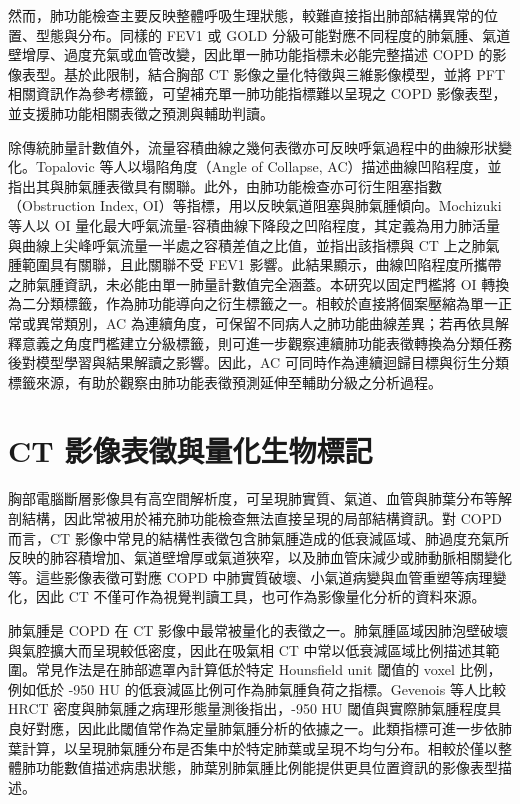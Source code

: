 \begin{ZhChapter}
然而，肺功能檢查主要反映整體呼吸生理狀態，較難直接指出肺部結構異常的位置、型態與分布。同樣的 FEV1 或 GOLD 分級可能對應不同程度的肺氣腫、氣道壁增厚、過度充氣或血管改變，因此單一肺功能指標未必能完整描述 COPD 的影像表型\cite{park2025qctcopd}。基於此限制，結合胸部 CT 影像之量化特徵與三維影像模型，並將 PFT 相關資訊作為參考標籤，可望補充單一肺功能指標難以呈現之 COPD 影像表型，並支援肺功能相關表徵之預測與輔助判讀。

除傳統肺量計數值外，流量容積曲線之幾何表徵亦可反映呼氣過程中的曲線形狀變化。Topalovic 等人以塌陷角度（Angle of Collapse, AC）描述曲線凹陷程度，並指出其與肺氣腫表徵具有關聯\cite{topalovic2013anglecollapse}。此外，由肺功能檢查亦可衍生阻塞指數（Obstruction Index, OI）等指標，用以反映氣道阻塞與肺氣腫傾向。Mochizuki 等人以 OI 量化最大呼氣流量-容積曲線下降段之凹陷程度，其定義為用力肺活量與曲線上尖峰呼氣流量一半處之容積差值之比值，並指出該指標與 CT 上之肺氣腫範圍具有關聯，且此關聯不受 FEV1 影響\cite{mochizuki2019concavity}。此結果顯示，曲線凹陷程度所攜帶之肺氣腫資訊，未必能由單一肺量計數值完全涵蓋。本研究以固定門檻將 OI 轉換為二分類標籤，作為肺功能導向之衍生標籤之一。相較於直接將個案壓縮為單一正常或異常類別，AC 為連續角度，可保留不同病人之肺功能曲線差異；若再依具解釋意義之角度門檻建立分級標籤，則可進一步觀察連續肺功能表徵轉換為分類任務後對模型學習與結果解讀之影響。因此，AC 可同時作為連續迴歸目標與衍生分類標籤來源，有助於觀察由肺功能表徵預測延伸至輔助分級之分析過程。

\section{CT 影像表徵與量化生物標記}\label{sec:ct_biomarkers}

胸部電腦斷層影像具有高空間解析度，可呈現肺實質、氣道、血管與肺葉分布等解剖結構，因此常被用於補充肺功能檢查無法直接呈現的局部結構資訊。對 COPD 而言，CT 影像中常見的結構性表徵包含肺氣腫造成的低衰減區域、肺過度充氣所反映的肺容積增加、氣道壁增厚或氣道狹窄，以及肺血管床減少或肺動脈相關變化等。這些影像表徵可對應 COPD 中肺實質破壞、小氣道病變與血管重塑等病理變化，因此 CT 不僅可作為視覺判讀工具，也可作為影像量化分析的資料來源\cite{matsuoka2010qctcopd,park2025qctcopd}。

肺氣腫是 COPD 在 CT 影像中最常被量化的表徵之一。肺氣腫區域因肺泡壁破壞與氣腔擴大而呈現較低密度，因此在吸氣相 CT 中常以低衰減區域比例描述其範圍。常見作法是在肺部遮罩內計算低於特定 Hounsfield unit 閾值的 voxel 比例，例如低於 -950 HU 的低衰減區比例可作為肺氣腫負荷之指標。Gevenois 等人比較 HRCT 密度與肺氣腫之病理形態量測後指出，-950 HU 閾值與實際肺氣腫程度具良好對應，因此此閾值常作為定量肺氣腫分析的依據之一\cite{gevenois1995density}。此類指標可進一步依肺葉計算，以呈現肺氣腫分布是否集中於特定肺葉或呈現不均勻分布。相較於僅以整體肺功能數值描述病患狀態，肺葉別肺氣腫比例能提供更具位置資訊的影像表型描述。


\end{ZhChapter}
